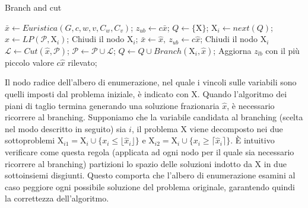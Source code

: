 \documentclass[11pt,oneside,a4paper]{article}
\begin{document}
\begin{algorithm}
\caption{Branch and cut}
\label{bac}

\begin{algorithmic}[1]

  \State $\bar{x} \gets Euristica(G,c,w,v,C_w,C_v)$;
  \State $z_{ub} \gets c\bar{x}$;
  \State $Q \gets \{\mathrm{X}\}$;
  \Repeat
    \State $\mathrm{X}_i \gets next(Q)$;
    \Repeat
      \State $\hat{x} \gets LP(\mathcal{P},\mathrm{X}_i)$;
        \State Chiudi il nodo $\mathrm{X}_i$;
        \State $\bar{x} \gets \hat{x}, \: z_{ub} \gets c\hat{x}$;
        \State Chiudi il nodo $\mathrm{X}_i$
      \Else
        \State $\mathcal{L} \gets Cut(\hat{x},\mathcal{P})$;
        \State $\mathcal{P} \gets \mathcal{P} \cup \mathcal{L}$;
      \EndIf
      \State $Q \gets Q \cup Branch(\mathrm{X}_i,\hat{x})$;
    \EndIf
      \State Aggiorna $z_{lb}$ con il più piccolo valore $c\hat{x}$ rilevato;
    \EndIf

\end{algorithmic}
\end{algorithm}

Il nodo radice dell'albero di enumerazione, nel quale i vincoli sulle variabili sono quelli
imposti dal problema iniziale, è indicato con $\mathrm{X}$. Quando l'algoritmo dei piani di taglio
termina generando una soluzione frazionaria $\hat{x}$, è necessario ricorrere al branching.
Supponiamo che la variabile candidata al branching (scelta nel modo descritto in seguito) sia $i$,
 il problema $\mathrm{X}$ viene decomposto nei due sottoproblemi $\mathrm{X}_{i1} =
\mathrm{X}_{i} \cup \{x_i \leq \lfloor \hat{x}_i \rfloor\}$ e $\mathrm{X}_{i2} = \mathrm{X}_{i}
\cup \{x_i \geq \lceil \hat{x}_i \rceil\}$. È intuitivo verificare come questa regola (applicata
ad ogni nodo per il quale sia necessario ricorrere al branching) partizioni lo spazio delle
soluzioni indotto da X in due sottoinsiemi disgiunti. Questo comporta che l'albero di
enumerazione esamini al caso peggiore ogni possibile soluzione del problema originale, garantendo
quindi la correttezza dell'algoritmo.
\end{document}
